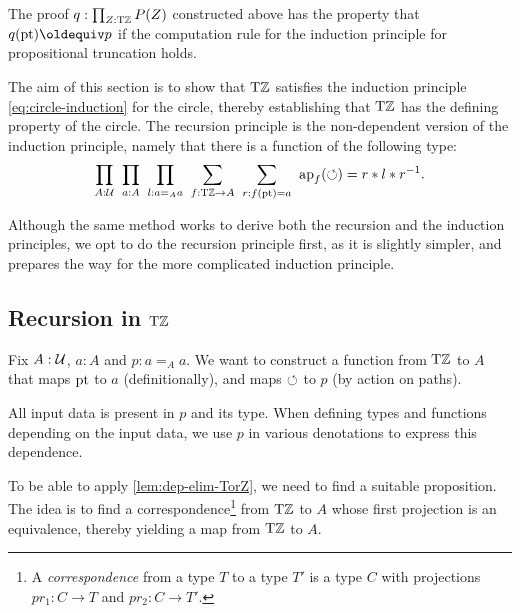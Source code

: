\documentclass[a4paper,12pt]{amsart}
\begin{document}
The proof $q: \prod_{Z:{\mathrm{T}\mathbb{Z}}} P(Z)$ constructed above has the property that $q(\pt)\jdeq p$ if the computation rule for the induction principle
for propositional truncation holds.

{The aim of this section is to show that ${\mathrm{T}\mathbb{Z}}$ satisfies the induction principle \cref{eq:circle-induction} for the circle,
thereby establishing that ${\mathrm{T}\mathbb{Z}}$ has the defining property of the circle.
The recursion principle is the non-dependent version of the induction principle,
namely that there is a function of the following type:
\begin{equation}
  \label{eq:circle-recursion}
  \thinmuskip=10mu              %
  \prod_{A: \UU}
  \prod_{a: A}
  \prod_{l: a=_A a}
  \sum_{f: \TorZ \to A}
  \sum_{r: f(\pt)= a}
  {\ap{f}(\Zloop) = r\ct l \ct r^{-1}}.
\end{equation}
}

Although the same method works to derive both the recursion and the induction principles,
we opt to do the recursion principle first, as it is slightly simpler,
and prepares the way for the more complicated induction principle.

\subsection{Recursion in ${\mathrm{T}\mathbb{Z}}$}\label{sec:TorZ-recursion}

Fix $A:\mathcal{U}$, $a:A$ and $p: a=_A a$.
We want to construct a function from ${\mathrm{T}\mathbb{Z}}$ to $A$
that maps ${\mathord{\mathrm{pt}}}$ to $a$ (definitionally),
and maps ${\circlearrowleft}$ to $p$ (by action on paths).

All input data is present in $p$ and its type.
When defining types and functions depending on the input data,
we use $p$ in various denotations to express this dependence.

To be able to apply \cref{lem:dep-elim-TorZ}, we need to find a suitable proposition.  {The idea is to find a
  correspondence\footnote{A {\em correspondence} from a type $T$ to a type $T'$ is a type $C$ with projections $pr_1 : C \to T$ and
    $pr_2 : C \to T'$.} from ${\mathrm{T}\mathbb{Z}}$ to $A$ whose first projection is an equivalence, thereby yielding a map from ${\mathrm{T}\mathbb{Z}}$ to $A$.}
\end{document}
